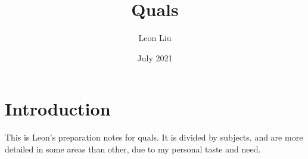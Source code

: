 \documentclass[11pt]{article}
\title{Quals}
\author{Leon Liu}
\date{July 2021}
\numberwithin{equation}{subsection}%
\theoremstyle{definition}
\theoremstyle{remark}
\begin{document}
\maketitle
\section{Introduction}
This is Leon's preparation notes for quals. It is divided by subjects, and are more detailed in some areas than other, due to my personal taste and need.
\tableofcontents







\end{document}
